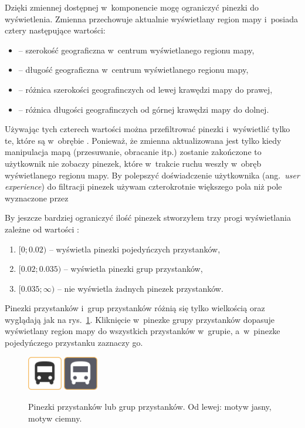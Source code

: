 \documentclass{SGGW-thesis}
\begin{document}
Dzięki zmiennej  dostępnej w~komponencie  mogę ograniczyć pinezki do wyświetlenia.
Zmienna  przechowuje aktualnie wyświetlany region mapy i~posiada cztery następujące wartości:
\begin{itemize}
  \item{ -- szerokość geograficzna w~centrum wyświetlanego regionu mapy,}
  \item{ -- długość geograficzna w~centrum wyświetlanego regionu mapy,}
  \item{ -- różnica szerokości geografinczych od lewej krawędzi mapy do prawej,}
  \item{ -- różnica długości geografinczych od górnej krawędzi mapy do dolnej.}
\end{itemize}
Używając tych czterech wartości można przefiltrować pinezki i~wyświetlić tylko te, które są w~obrębie .
Ponieważ, że zmienna  aktualizowana jest tylko kiedy manipulacja mapą (przesuwanie, obracanie itp.) zostanie zakończone to użytkownik nie zobaczy pinezek,
które w~trakcie ruchu weszły w~obręb wyświetlanego regionu mapy.
By polepszyć doświadczenie użytkownika (ang.~\textit{user experience}) do filtracji pinezek używam czterokrotnie większego pola niż pole wyznaczone przez 

By jeszcze bardziej ograniczyć ilość pinezek stworzyłem trzy progi wyświetlania zależne od wartości :
\begin{enumerate}
  \item{$[0;0.02)$ -- wyświetla pinezki pojedyńczych przystanków,}
  \item{$[0.02; 0.035)$ -- wyświetla pinezki grup przystanków,}
  \item{$[0.035;\infty)$ -- nie wyświetla żadnych pinezek przystanków.}
\end{enumerate}


Pinezki przystanków i~grup przystanków różnią się tylko wielkością oraz wyglądają jak na rys.~\ref{screen.pin_przystanki}.
Kliknięcie w~pinezke grupy przystanków dopasuje wyświetlany region mapy do wszystkich przystanków w~grupie,
a~w~pinezke pojedyńczego przystanku zaznaczy go.
\begin{figure}
  \centering
  \includegraphics[width=15mm]{screeny/busstop_jasny}
  \enspace\enspace
  \includegraphics[width=15mm]{screeny/busstop_ciemny}
  \caption[Pinezki przystanków]{
    \label{screen.pin_przystanki}
    Pinezki przystanków lub grup przystanków. Od lewej: motyw jasny, motyw ciemny. \vspace{2ex}
  }
\end{figure}
\end{document}
